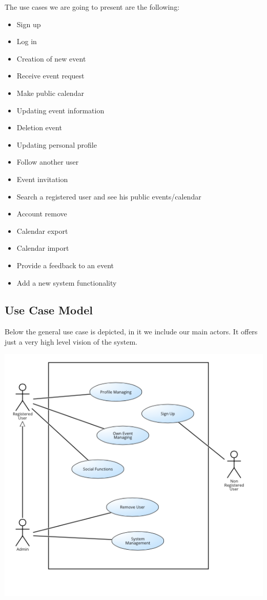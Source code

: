 \documentclass[12pt]{book}
\begin{document}
The use cases we are going to present are the following: 
\begin{itemize}
	\item{Sign up}
	\item{Log in}
	\item{Creation of new event}
	\item{Receive event request}
	\item{Make public calendar}
	\item{Updating event information}
	\item{Deletion event}
	\item{Updating personal profile}
	\item{Follow another user}
	\item{Event invitation}
	\item{Search a registered user and see his public events/calendar}
	\item{Account remove}
	\item{Calendar export}
	\item{Calendar import}
	\item{Provide a feedback to an event}
	\item{Add a new system functionality}	
 \end{itemize}

\subsection{Use Case Model}
Below the general use case is depicted, in it we include our main actors. 
It offers just a very high level vision of the system. 
\begin{center}
\includegraphics[scale=0.8]{generalUC}
\end{center}
\end{document}
